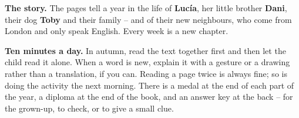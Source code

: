 \textbf{The story.} The pages tell a year in the life of
\textbf{Lucía}, her little brother \textbf{Dani}, their dog
\textbf{Toby} and their family -- and of their new neighbours, who come
from London and only speak English. Every week is a new chapter.

\textbf{Ten minutes a day.} In autumn, read the text together first and
then let the child read it alone. When a word is new, explain it with a
gesture or a drawing rather than a translation, if you can. Reading a
page twice is always fine; so is doing the activity the next morning.
There is a medal at the end of each part of the year, a diploma at the
end of the book, and an answer key at the back -- for the grown-up, to
check, or to give a small clue.
\newpage
